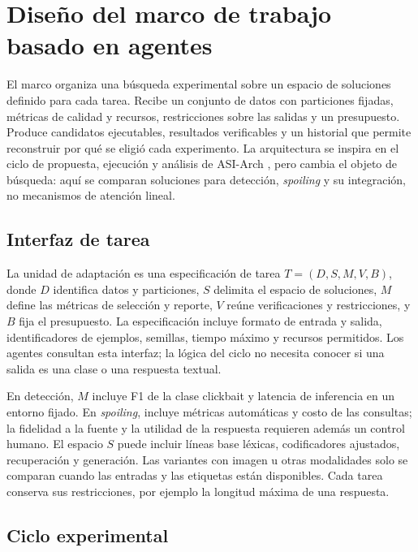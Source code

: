 \chapter[Marco de agentes]{Diseño del marco de trabajo basado en agentes}
\label{cap:agentes}

El marco organiza una búsqueda experimental sobre un espacio de soluciones definido para cada tarea. Recibe un conjunto de datos con particiones fijadas, métricas de calidad y recursos, restricciones sobre las salidas y un presupuesto. Produce candidatos ejecutables, resultados verificables y un historial que permite reconstruir por qué se eligió cada experimento. La arquitectura se inspira en el ciclo de propuesta, ejecución y análisis de ASI-Arch \citep{liu2025asiarch}, pero cambia el objeto de búsqueda: aquí se comparan soluciones para detección, \emph{spoiling} y su integración, no mecanismos de atención lineal.

\section{Interfaz de tarea}

La unidad de adaptación es una especificación de tarea $T=(D,S,M,V,B)$, donde $D$ identifica datos y particiones, $S$ delimita el espacio de soluciones, $M$ define las métricas de selección y reporte, $V$ reúne verificaciones y restricciones, y $B$ fija el presupuesto. La especificación incluye formato de entrada y salida, identificadores de ejemplos, semillas, tiempo máximo y recursos permitidos. Los agentes consultan esta interfaz; la lógica del ciclo no necesita conocer si una salida es una clase o una respuesta textual.

En detección, $M$ incluye F1 de la clase clickbait y latencia de inferencia en un entorno fijado. En \emph{spoiling}, incluye métricas automáticas y costo de las consultas; la fidelidad a la fuente y la utilidad de la respuesta requieren además un control humano. El espacio $S$ puede incluir líneas base léxicas, codificadores ajustados, recuperación y generación. Las variantes con imagen u otras modalidades solo se comparan cuando las entradas y las etiquetas están disponibles. Cada tarea conserva sus restricciones, por ejemplo la longitud máxima de una respuesta.

\section{Ciclo experimental}


